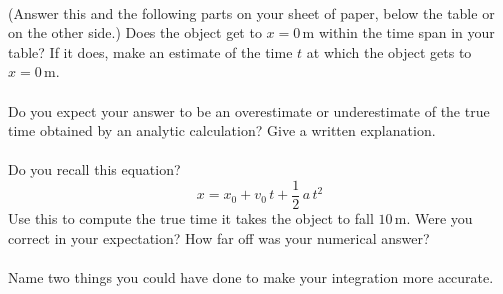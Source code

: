 \documentclass[12pt]{article}
\newcommand{\m}{\mathrm{m}}
\newcounter{problem}
\begin{document}
\paragraph{\theproblem}%
(Answer this and the following parts on your sheet of paper, below the
table or on the other side.)  Does the object get to $x=0\,\m$ within
the time span in your table?  If it does, make an estimate of the time
$t$ at which the object gets to $x=0\,\m$.

\paragraph{\theproblem}%
Do you expect your answer to be an overestimate or underestimate of
the true time obtained by an analytic calculation?  Give a written
explanation.

\paragraph{\theproblem}%
Do you recall this equation?
\begin{equation}
x = x_0 + v_0\,t + \frac{1}{2}\,a\,t^2
\end{equation}
Use this to compute the true time it takes the object to fall
$10\,\m$.  Were you correct in your expectation?  How far off was your
numerical answer?

\paragraph{\theproblem}%
Name two things you could have done to make your integration more
accurate.
\end{document}
